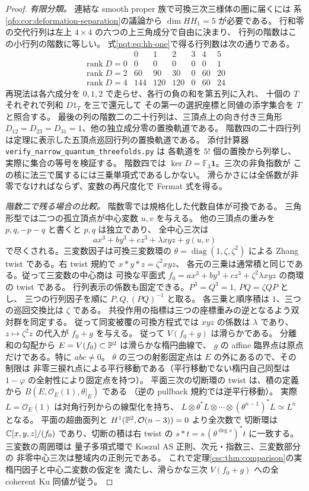 \begin{proof}
\emph{有限分類。}
連結な smooth proper 族で可換三次三様体の圏に届くには
系\ref{qfo:cor:deformation-separation}の議論から $\dim HH_1=5$ が必要である。
行和零の交代行列は左上 $4\times4$ の六つの上三角成分で自由に決まり、
行列の階数はこの小行列の階数に等しい。
式\eqref{nqt:eq:hh-one}で得る行列数は次の通りである。
\[
\begin{array}{c|rrrrrr}
 &0&1&2&3&4&5\\\hline
\operatorname{rank}D=0&0&0&0&0&0&1\\
\operatorname{rank}D=2&60&90&30&0&60&20\\
\operatorname{rank}D=4&144&120&120&0&60&24
\end{array}
\]
再現法は各六成分を $0,1,2$ で走らせ、各行の負の和を第五列に入れ、
十個の $T$ それぞれで列和 $D1_T$ を三で還元して
その第一の選択座標と同値の添字集合を $T$ と照合する。
最後の列の階数二の二十行列は、三頂点上の向き付き三角形
$D_{12}=D_{23}=D_{31}=1$、他の独立成分零の置換軌道である。
階数四の二十四行列は定理に表示した五頂点巡回行列の置換軌道である。
添付計算器 \texttt{verify\_narrow\_quantum\_threefolds.py} は
各軌道を $5!$ 個の置換から列挙し、実際に集合の等号を検証する。
階数四では $\ker D=\mathbb F_3\mathbf1$。三次の非負指数が
この核に法三で属するには三乗単項式であるしかない。
滑らかさには全係数が非零でなければならず、変数の再尺度化で Fermat 式を得る。

\emph{階数二で残る場合の比較。}
階数零では規格化した代数自体が可換である。
三角形型では二つの孤立頂点が中心変数 $u,v$ を与える。
他の三頂点の重みを $p,q,-p-q$ と書くと $p,q$ は独立であり、
全中心三次は
\[
 ax^3+by^3+cz^3+\lambda xyz+g(u,v)
\]
で尽くされる。三変数因子は可換三変数環の
$\theta=\operatorname{diag}(1,\zeta,\zeta^2)$ による Zhang twist
である。右 twist 規約で $x*y*z=\zeta^2 xyz$、
各元の三乗は通常積と同じである。従って三変数の中心商は
可換な平面式 $f_0=ax^3+by^3+cz^3+\zeta^2\lambda xyz$ の商環の twist である。
行列表示の係数も固定できる。$P^3=Q^3=1$, $PQ=\zeta QP$ とし、
三つの行列因子を順に $P,Q,(PQ)^{-1}$ と取る。
各三乗と順序積は $1$、三つの巡回交換比は $\zeta$ である。
共役作用の指標は三つの座標重みの逆となるよう双対群を同定する。
従って同変被覆の可換方程式では $xyz$ の係数は $\lambda$ であり、
$z\mapsto\zeta^2 z$ の代入が $f_0+g$ を与える。
従って $V(f_0+g)$ は滑らかである。
分離和の勾配から $E=V(f_0)\subset\mathbb P^2$ は滑らかな楕円曲線で、
$g$ の affine 臨界点は原点だけである。特に $abc\ne0$。
$\theta$ の三つの射影固定点は $E$ の外にあるので、その制限は
非零三捩れ点による平行移動である（平行移動でない楕円自己同型は
$1-\varphi$ の全射性により固定点を持つ）。
平面三次の切断環の twist は、積の定義から
$B(E,\mathcal O_E(1),\theta|_E)$ である
（逆の pullback 規約では逆平行移動）。
実際 $L=\mathcal O_E(1)$ は対角行列からの線型化を持ち、
$L\otimes\theta^*L\otimes\cdots\otimes(\theta^{n-1})^*L\simeq L^n$ となる。
平面の超曲面列と $H^1(\mathbb P^2,\mathcal O(n-3))=0$ より全次数で
切断環は $\mathbb C[x,y,z]/(f_0)$ であり、切断の積は右 twist の
$s*t=s\,(\theta^{\deg s})^*t$ に一致する。三変数の周囲環は
量子多項式環で Koszul AS 正則、次元・指数三、三変数部分の
非零中心三次は整域内の正則元である。
これで定理\ref{csc:thm:comparison}の実楕円因子と中心二変数の仮定を
満たし、滑らかな三次 $V(f_0+g)$ への全 coherent Ku 同値が従う。
\end{proof}

